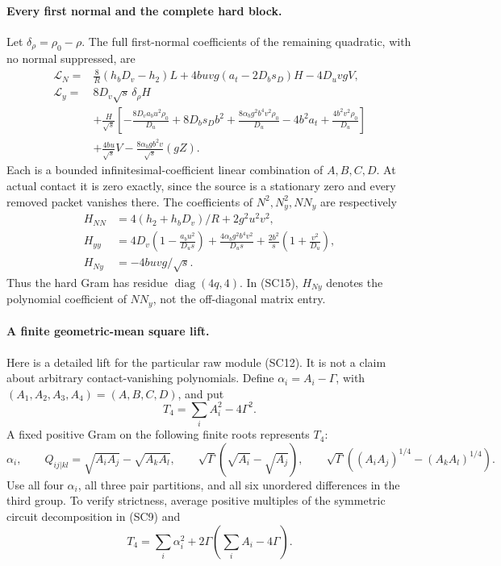 \paragraph{Every first normal and the complete hard block.}
Let $\delta_\rho=\rho_0-\rho$. The full first-normal coefficients
of the remaining quadratic, with no normal suppressed, are
\begin{align*}
 \mathcal L_N={}&\frac8R(h_bD_v-h_2)L
       +4buvg(a_t-2D_bs_D)H-4D_uvgV,\\
 \mathcal L_y={}&8D_v\sqrt{s}\,\delta_\rho H\\
 &+\frac H{\sqrt s}\left[
 -\frac{8D_va_bu^2\rho_0}{D_u}+8D_bs_Db^2
 +\frac{8\alpha_bg^2b^4v^2\rho_0}{D_u}
 -4b^2a_t+\frac{4b^2v^2\rho_0}{D_u}\right]\\
 &+\frac{4bu}{\sqrt{s}}V
       -\frac{8\alpha_bgb^2v}{\sqrt{s}}(gZ).
                                                        \tag{SC14}
\end{align*}
Each is a bounded infinitesimal-coefficient linear combination of
$A,B,C,D$. At actual contact it is zero exactly, since the source
is a stationary zero and every removed packet vanishes there.
The coefficients of $N^2,N_y^2,NN_y$ are respectively
\[
\begin{aligned}
 H_{NN}&=4(h_2+h_bD_v)/R+2g^2u^2v^2,\\
 H_{yy}&=4D_v\left(1-\frac{a_bu^2}{D_us}\right)
       +\frac{4\alpha_bg^2b^4v^2}{D_us}
       +\frac{2b^2}{s}\left(1+\frac{v^2}{D_u}\right),\\
 H_{Ny}&=-4buvg/\sqrt{s}.
\end{aligned}                                                     \tag{SC15}
\]
Thus the hard Gram has residue $\operatorname{diag}(4q,4)$.
In (SC15), $H_{Ny}$ denotes the polynomial coefficient of $NN_y$,
not the off-diagonal matrix entry.

\paragraph{A finite geometric-mean square lift.}
Here is a detailed lift for the particular raw module (SC12).
It is not a claim about arbitrary contact-vanishing polynomials.
Define $\alpha_i=A_i-\Gamma$, with
$(A_1,A_2,A_3,A_4)=(A,B,C,D)$, and put
\[
 T_4=\sum_iA_i^2-4\Gamma^2.
\]
A fixed positive Gram on the following finite roots represents $T_4$:
\[
 \alpha_i,\qquad
 Q_{ij|kl}=\sqrt{A_iA_j}-\sqrt{A_kA_l},\qquad
 \sqrt\Gamma(\sqrt{A_i}-\sqrt{A_j}),\qquad
 \sqrt\Gamma((A_iA_j)^{1/4}-(A_kA_l)^{1/4}).          \tag{SC16}
\]
Use all four $\alpha_i$, all three pair partitions, and all six
unordered differences in the third group. To verify strictness, average
positive multiples of the symmetric circuit decomposition in (SC9) and
\[
 T_4=\sum_i\alpha_i^2+2\Gamma\left(\sum_iA_i-4\Gamma\right).
\]

